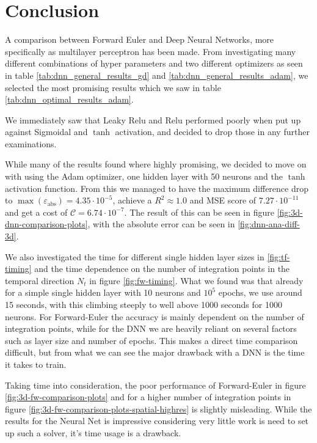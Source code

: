 \section{Conclusion}
A comparison between Forward Euler and Deep Neural Networks, more specifically as multilayer perceptron has been made. From investigating many different combinations of hyper parameters and two different optimizers as seen in table \ref{tab:dnn_general_results_gd} and \ref{tab:dnn_general_results_adam}, we selected the most promising results which we saw in table \ref{tab:dnn_optimal_results_adam}. 

We immediately saw that Leaky Relu and Relu performed poorly when put up against Sigmoidal and $\tanh$ activation, and decided to drop those in any further examinations.

While many of the results found where highly promising, we decided to move on with using the Adam optimizer, one hidden layer with 50 neurons and the $\tanh$ activation function. From this we managed to have the maximum difference drop to $\max(\varepsilon_\mathrm{abs})=4.35\cdot 10^{-5}$, achieve a $R^2 \approx 1.0$ and MSE score of $7.27\cdot 10^{-11}$ and get a cost of $\mathcal{C} = 6.74 \cdot 10^{-7}$. The result of this can be seen in figure \ref{fig:3d-dnn-comparison-plots}, with the absolute error can be seen in \ref{fig:dnn-ana-diff-3d}.

We also investigated the time for different single hidden layer sizes in \ref{fig:tf-timing} and the time dependence on the number of integration points in the temporal direction $N_t$ in figure \ref{fig:fw-timing}. What we found was that already for a simple single hidden layer with 10 neurons and $10^5$ epochs, we use around 15 seconds, with this climbing steeply to well above 1000 seconds for 1000 neurons. For Forward-Euler the accuracy is mainly dependent on the number of integration points, while for the DNN we are heavily reliant on several factors such as layer size and number of epochs. This makes a direct time comparison difficult, but from what we can see the major drawback with a DNN is the time it takes to train.

Taking time into consideration, the poor performance of Forward-Euler in figure \ref{fig:3d-fw-comparison-plots} and for a higher number of integration points in figure \ref{fig:3d-fw-comparison-plots-spatial-highres} is slightly misleading. While the results for the Neural Net is impressive considering very little work is need to set up such a solver, it's time usage is a drawback.

